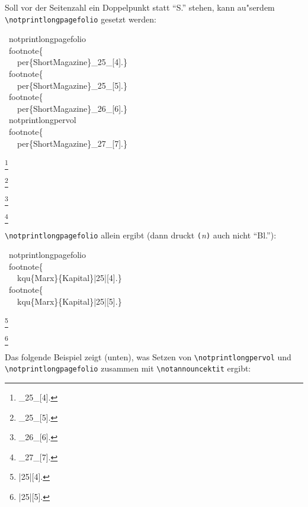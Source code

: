 \documentclass[12pt,a4paper]{article}
\newcommand{\pbs}{\string\ \unskip}
\newcommand{\bs}{\protect\pbs}
\begin{document}
\vfill\noindent
Soll vor der Seitenzahl ein Doppelpunkt statt "`S."' stehen, 
kann au"serdem \verb|\notprintlongpagefolio| gesetzt werden:

\Doppelbox
{
 \bs notprintlongpagefolio
 \\[.5ex] \bs footnote\{ 
 \\ \ \ \bs per\{ShortMagazine\}\string_25\string_[4].\}
 \\[.2ex] \bs footnote\{ 
 \\ \ \ \bs per\{ShortMagazine\}\string_25\string_[5].\}
 \\[.2ex] \bs footnote\{ 
 \\ \ \ \bs per\{ShortMagazine\}\string_26\string_[6].\}
 \\[1ex] \bs notprintlongpervol
 \\[.5ex] \bs footnote\{
 \\ \ \ \bs per\{ShortMagazine\}\string_27\string_[7].\}
}
{
 \notprintlongpagefolio
 \footnote{_25_[4].}

 \footnote{_25_[5].}

 \footnote{_26_[6].}

 \notprintlongpervol
 \footnote{_27_[7].}
}

\noindent
\verb|\notprintlongpagefolio| allein ergibt (dann druckt
\verb|(|\textit{n}\verb|)| auch nicht "`Bl."'):

\vspace{-.5ex}
\Doppelbox
{
\bs notprintlongpagefolio
\\[1ex] \bs footnote\{ 
\\ \ \ \bs kqu\{Marx\}\{Kapital\}\string|25\string|[4].\}
\\[1ex] \bs footnote\{ 
\\ \ \ \bs kqu\{Marx\}\{Kapital\}\string|25\string|[5].\}
}
{
\notprintlongpagefolio
\footnote{
|25|[4].}

\footnote{
|25|[5].}
}

\vspace{-.5ex}\noindent
Das folgende Beispiel zeigt (unten), was Setzen von
\verb|\notprintlongpervol| und \verb|\notprintlongpagefolio| 
zusammen mit \verb|\notannouncektit| ergibt:
\end{document}
